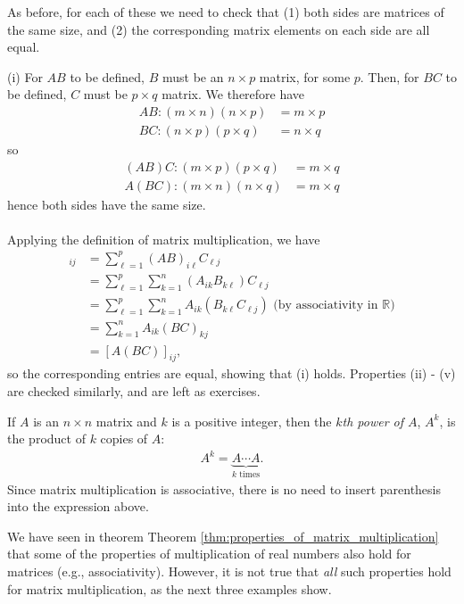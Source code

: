 \documentclass[12pt,letterpaper,reqno]{article}
\numberwithin{equation}{section}
\newcommand{\ti}[1]{\textit{#1}}
\begin{document}
\begin{pf}
As before, for each of these we need to check that (1) both sides are matrices of the same size, and (2) the corresponding matrix elements on each side are all equal. 

(i) For $AB$ to be defined, $B$ must be an $n \times p$ matrix, for some $p$. Then, for $BC$ to be defined, $C$ must be $p \times q$ matrix. We therefore have 
\begin{align*}
	AB: (m \times n)(n \times p)&=m \times p \\
	BC: (n \times p)(p \times q)&=n \times q
\end{align*}
so
\begin{align*}
	(AB)C: (m \times p)(p \times q)&=m \times q \\
	A(BC): (m \times n)(n \times q)&=m \times q
\end{align*}
hence both sides have the same size. \\
\\

Applying the definition of matrix multiplication, we have
\begin{align*}
	[(AB)C]_{ij}&=\sum_{\ell=1}^p(AB)_{i\ell}C_{\ell j} \\
	&=\sum_{\ell=1}^p\sum_{k=1}^n (A_{ik}B_{k\ell})C_{\ell j} \\
	&=\sum_{\ell=1}^p\sum_{k=1}^n A_{ik}(B_{k\ell}C_{\ell j}) \text{ (by associativity in $\mathbb{R}$)}\\
	&=\sum_{k=1}^nA_{ik}(BC)_{kj} \\
	&=[A(BC)]_{ij},
\end{align*}
so the corresponding entries are equal, showing that (i) holds. Properties (ii) - (v) are checked similarly, and are left as exercises.	
\end{pf}

\begin{defn}
	If $A$ is an $n\times n$ matrix and $k$ is a positive integer, then the \ti{$k$th power of $A$}, $A^k$, is the product of $k$ copies of $A$:
\begin{align*}
	A^k=\underbrace{A \cdots A}_{\text{$k$ times}}.
\end{align*}
Since matrix multiplication is associative, there is no need to insert parenthesis into the expression above.
\end{defn}

We have seen in theorem Theorem \ref{thm:properties_of_matrix_multiplication} that some of the properties of multiplication of real numbers also hold for matrices (e.g., associativity). However, it is not true that \emph{all} such properties hold for matrix multiplication, as the next three examples show.
\end{document}
